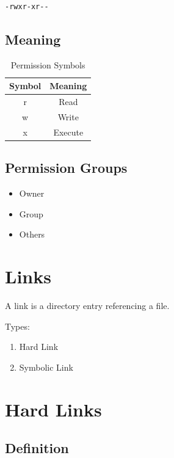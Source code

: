 \begin{verbatim}
-rwxr-xr--
\end{verbatim}

\subsection{Meaning}

\begin{table}[h]
\centering
\begin{tabular}{|c|c|}
\hline
Symbol & Meaning \\
\hline
r & Read \\
w & Write \\
x & Execute \\
\hline
\end{tabular}
\caption{Permission Symbols}
\end{table}

\subsection{Permission Groups}

\begin{itemize}
\item Owner
\item Group
\item Others
\end{itemize}

\section{Links}

A link is a directory entry referencing a file.

Types:

\begin{enumerate}
\item Hard Link
\item Symbolic Link
\end{enumerate}

\section{Hard Links}

\subsection{Definition}

